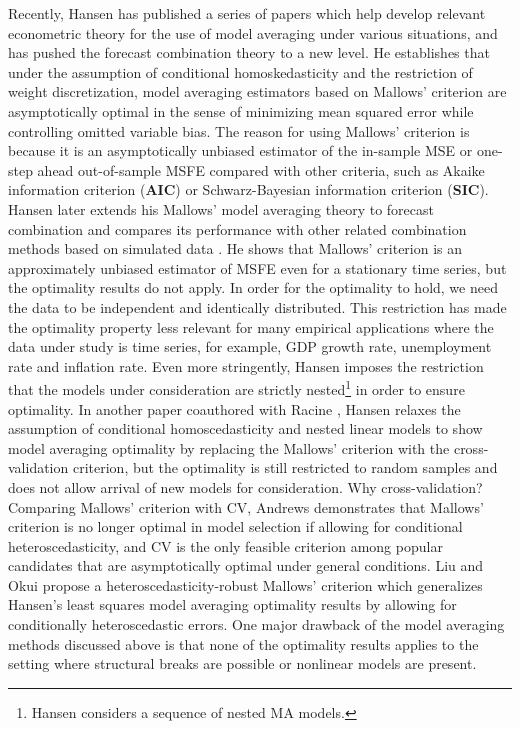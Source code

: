 Recently, Hansen has published a series of papers \cite{hansen_EMETRICA2007} \cite{hansen_JE2008} \cite{hansen2009averaging} \cite{hansen2011jackknife} which help develop relevant econometric theory for the use of model averaging under various situations, and has pushed the forecast combination theory to a new level. He establishes that under the assumption of conditional homoskedasticity and the restriction of weight discretization, model averaging estimators based on Mallows' criterion are asymptotically optimal in the sense of minimizing mean squared error while controlling omitted variable bias. The reason for using Mallows' criterion is because it is an asymptotically unbiased estimator of the in-sample MSE or one-step ahead out-of-sample MSFE compared with other criteria, such as Akaike information criterion (\textbf{AIC}) or Schwarz-Bayesian information criterion (\textbf{SIC}). Hansen later extends his Mallows' model averaging theory to forecast combination and compares its performance with other related combination methods based on simulated data \cite{hansen_JE2008}. He shows that Mallows' criterion is an approximately unbiased estimator of MSFE even for a stationary time series, but the optimality results do not apply. In order for the optimality to hold, we need the data to be independent and identically distributed. This restriction has made the optimality property less relevant for many empirical applications where the data under study is time series, for example, GDP growth rate, unemployment rate and inflation rate. Even more stringently, Hansen imposes the restriction that the models under consideration are strictly nested\footnote{Hansen considers a sequence of nested MA models.} in order to ensure optimality. In another paper coauthored with Racine \cite{hansen2011jackknife}, Hansen relaxes the assumption of conditional homoscedasticity and nested linear models to show model averaging optimality by replacing the Mallows' criterion with the cross-validation criterion, but the optimality is still restricted to random samples and does not allow arrival of new models for consideration. Why cross-validation? Comparing Mallows' criterion with CV, Andrews \cite{andrews_JE1991} demonstrates that Mallows' criterion is no longer optimal in model selection if allowing for conditional heteroscedasticity, and CV is the only feasible criterion among popular candidates that are asymptotically optimal under general conditions. Liu and Okui \cite{liu_okui2012} propose a heteroscedasticity-robust Mallows' criterion which generalizes Hansen's least squares model averaging optimality results by allowing for conditionally heteroscedastic errors. One major drawback of the model averaging methods discussed above is that none of the optimality results applies to the setting where structural breaks are possible or nonlinear models are present.

